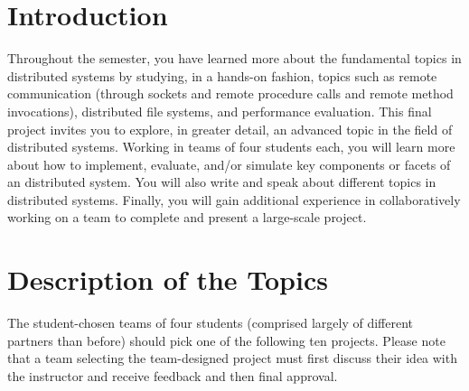 

\usepackage[compact]{titlesec}


\section*{Introduction}

Throughout the semester, you have learned more about the fundamental topics in distributed systems by studying, in a
hands-on fashion, topics such as remote communication (through sockets and remote procedure calls and remote method
invocations), distributed file systems, and performance evaluation. This final project invites you to explore, in
greater detail, an advanced topic in the field of distributed systems. Working in teams of four students each, you will
learn more about how to implement, evaluate, and/or simulate key components or facets of an distributed system. You will
also write and speak about different topics in distributed systems.  Finally, you will gain additional experience in
collaboratively working on a team to complete and present a large-scale project.

\section*{Description of the Topics}

The student-chosen teams of four students (comprised largely of different partners than before) should pick one of the
following ten projects.  Please note that a team selecting the team-designed project must first discuss their idea with
the instructor and receive feedback and then final approval.

